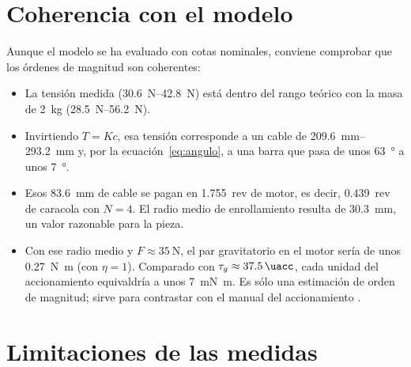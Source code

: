 \section{Coherencia con el modelo}

Aunque el modelo se ha evaluado con cotas nominales, conviene comprobar que los órdenes de magnitud
son coherentes:

\begin{itemize}
  \item La tensión medida (\SIrange{30.6}{42.8}{\newton}) está dentro del rango teórico con la masa
        de \SI{2}{\kilo\gram} (\SIrange{28.5}{56.2}{\newton}).
  \item Invirtiendo $T=Kc$, esa tensión corresponde a un cable de \SIrange{209.6}{293.2}{\milli\metre}
        y, por la ecuación~\eqref{eq:angulo}, a una barra que pasa de unos \SI{63}{\degree} a unos
        \SI{7}{\degree}.
  \item Esos \SI{83.6}{\milli\metre} de cable se pagan en \SI{1.755}{rev} de motor, es decir,
        \SI{0.439}{rev} de caracola con $N=4$. El radio medio de enrollamiento resulta de
        \SI{30.3}{\milli\metre}, un valor razonable para la pieza.
  \item Con ese radio medio y $F\approx\SI{35}{\newton}$, el par gravitatorio en el motor sería de
        unos \SI{0.27}{\newton\metre} (con $\eta = 1$). Comparado con $\tau_g\approx\SI{37.5}{\uacc}$,
        cada unidad del accionamiento equivaldría a unos \SI{7}{\milli\newton\metre}. Es sólo una
        estimación de orden de magnitud; sirve para contrastar con el manual del accionamiento
        .
\end{itemize}

\section{Limitaciones de las medidas}
\label{sec:res-limitaciones}

